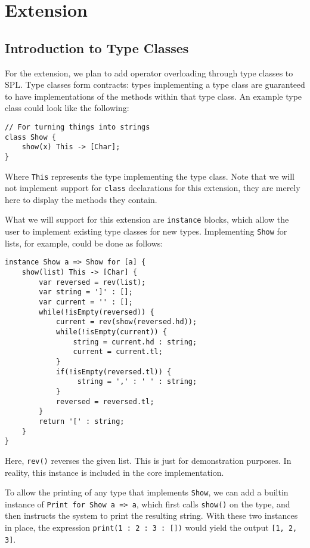 \chapter{Extension}\label{chapter:extension}

\section{Introduction to Type Classes}
For the extension, we plan to add operator overloading through type classes to SPL. Type classes form contracts: types implementing a type class are guaranteed to have implementations of the methods within that type class. An example type class could look like the following:

\begin{lstlisting}
// For turning things into strings
class Show {
    show(x) This -> [Char];
}
\end{lstlisting}

Where \lstinline{This} represents the type implementing the type class. Note that we will not implement support for \lstinline|class| declarations for this extension, they are merely here to display the methods they contain.

What we will support for this extension are \lstinline|instance| blocks, which allow the user to implement existing type classes for new types. Implementing \lstinline|Show| for lists, for example, could be done as follows:

\begin{lstlisting}
instance Show a => Show for [a] {
    show(list) This -> [Char] {
        var reversed = rev(list);
        var string = ']' : [];
        var current = '' : [];
        while(!isEmpty(reversed)) {
            current = rev(show(reversed.hd));
            while(!isEmpty(current)) {
                string = current.hd : string;
                current = current.tl;
            }
            if(!isEmpty(reversed.tl)) {
                 string = ',' : ' ' : string;
            }
            reversed = reversed.tl;
        }
        return '[' : string;
    }
}
\end{lstlisting}

Here, \lstinline|rev()| reverses the given list. This is just for demonstration purposes. In reality, this instance is included in the core implementation.

To allow the printing of any type that implements \lstinline|Show|, we can add a builtin instance of \lstinline|Print for Show a => a|, which first calls \lstinline|show()| on the type, and then instructs the system to print the resulting string. With these two instances in place, the expression \lstinline|print(1 : 2 : 3 : [])| would yield the output \lstinline[language={}]|[1, 2, 3]|.

